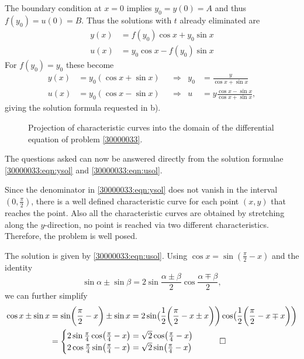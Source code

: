 \begin{loesung}
The boundary condition at $x=0$ implies $y_0=y(0)=A$ and thus
$f(y_0) = u(0) = B$.
Thus the solutions with $t$ already eliminated are
\begin{align*}
y(x) &= f(y_0)\cos x +   y_0  \sin x \\
u(x) &=   y_0 \cos x - f(y_0) \sin x 
\end{align*}
For $f(y_0)=y_0$ these become
\begin{align}
y(x) &=   y_0(\cos x + \sin x) 
&&\Rightarrow &
y_0 &= \frac{y}{\cos x + \sin x}
\label{30000033:eqn:ysol}
\\
u(x) &=   y_0(\cos x - \sin x)
&&\Rightarrow &
u &= y\frac{\cos x - \sin x}{\cos x + \sin x},
\label{30000033:eqn:usol}
\end{align}
giving the solution formula requested in b).
\begin{figure}
\centering
{}
\caption{Projection of characteristic curves into the domain of the
differential equation of problem \ref{30000033}.
\label{30000033:char}}
\end{figure}
The questions asked can now be answered directly from the solution formulae
\eqref{30000033:eqn:ysol} and \eqref{30000033:eqn:usol}.
\begin{teilaufgaben}
\item
Since the denominator in \eqref{30000033:eqn:ysol} does not vanish
in the interval $(0,\frac{\pi}2)$, there is a well defined characteristic
curve for each point $(x,y)$ that reaches the point.
Also all the characteristic curves are obtained by stretching along
the $y$-direction, no point is reached via two different characteristics.
Therefore, the problem is well posed.
\item
The solution is given by \eqref{30000033:eqn:usol}.
Using $\cos x = \sin(\frac{\pi}2-x)$ and the identity
\[
\sin\alpha\pm\sin\beta
=
2\sin\frac{\alpha\pm\beta}2 \cos\frac{\alpha\mp\beta}2
,
\]
we can further simplify
\begin{align*}
\cos x \pm \sin x
&=
\sin\biggl(\frac{\pi}2-x\biggr) \pm \sin x
=
2
\sin\bigl(\frac12\biggl(\frac{\pi}2-x \pm x\biggr)\biggr)
\cos\bigl(\frac12\biggl(\frac{\pi}2-x \mp x\biggr)\biggr)
\\
&=
\begin{cases}
2
\sin \frac{\pi}4
\cos \bigl(\frac{\pi}4-x\bigr)
=
\sqrt{2}\cos\bigl(\frac{\pi}4-x\bigr)
\\
2
\cos \frac{\pi}4
\sin \bigl(\frac{\pi}4-x\bigr)
=
\sqrt{2}\sin\bigl(\frac{\pi}4-x\bigr)
\end{cases}
\qedhere
\end{align*}
\end{teilaufgaben}
\end{loesung}

